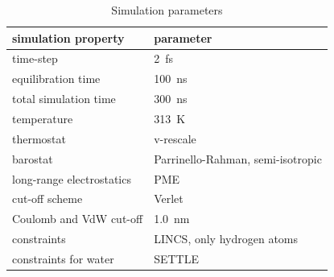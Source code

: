 \documentclass[aip,jcp,twocolumn]{revtex4}
\begin{document}
\begin{table}[btp]
  \caption{Simulation parameters}
  \label{tbl:mdpar}
  \begin{tabular}{ll}
    simulation property & parameter   \\
    \hline
    time-step           & 2~fs         \\
    equilibration time  & 100~ns  \\
    total simulation time     & 300~ns  \\
    temperature         & 313~K       \\
    thermostat          & v-rescale  \cite{bussi07}   \\
    barostat            & Parrinello-Rahman, semi-isotropic \cite{parrinello81} \\
    long-range electrostatics & PME  \cite{darden93}  \\
    cut-off scheme      & Verlet \cite{Pall13}      \\
    Coulomb and VdW cut-off & 1.0~nm \\
    constraints         & LINCS, only hydrogen atoms \cite{hess97} \\
    constraints for water & SETTLE  \cite{miyamoto92} \\
    \hline
  \end{tabular}
\end{table}






\listoftodos
\end{document}
